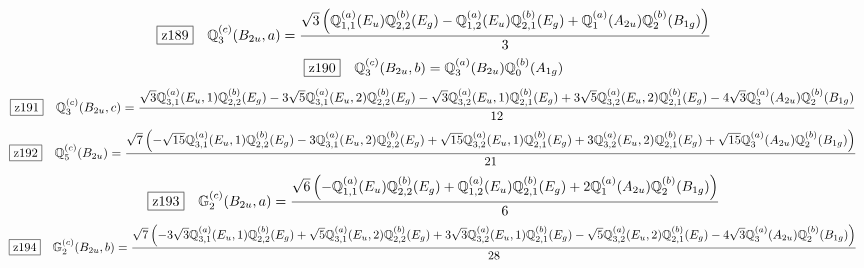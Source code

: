 \documentclass[fleqn,10pt,landscape]{jsarticle}
\begin{document}
\begin{dmath*}
\hspace*{3mm}\fbox{z189}\quad \mathbb{Q}_{3}^{(c)}(B_{2u},a)=\frac{\sqrt{3} \left(\mathbb{Q}_{1,1}^{(a)}(E_{u}) \mathbb{Q}_{2,2}^{(b)}(E_{g}) - \mathbb{Q}_{1,2}^{(a)}(E_{u}) \mathbb{Q}_{2,1}^{(b)}(E_{g}) + \mathbb{Q}_{1}^{(a)}(A_{2u}) \mathbb{Q}_{2}^{(b)}(B_{1g})\right)}{3}
\end{dmath*}
\begin{dmath*}
\hspace*{3mm}\fbox{z190}\quad \mathbb{Q}_{3}^{(c)}(B_{2u},b)=\mathbb{Q}_{3}^{(a)}(B_{2u}) \mathbb{Q}_{0}^{(b)}(A_{1g})
\end{dmath*}
\begin{dmath*}
\hspace*{3mm}\fbox{z191}\quad \mathbb{Q}_{3}^{(c)}(B_{2u},c)=\frac{\sqrt{3} \mathbb{Q}_{3,1}^{(a)}(E_{u},1) \mathbb{Q}_{2,2}^{(b)}(E_{g}) - 3 \sqrt{5} \mathbb{Q}_{3,1}^{(a)}(E_{u},2) \mathbb{Q}_{2,2}^{(b)}(E_{g}) - \sqrt{3} \mathbb{Q}_{3,2}^{(a)}(E_{u},1) \mathbb{Q}_{2,1}^{(b)}(E_{g}) + 3 \sqrt{5} \mathbb{Q}_{3,2}^{(a)}(E_{u},2) \mathbb{Q}_{2,1}^{(b)}(E_{g}) - 4 \sqrt{3} \mathbb{Q}_{3}^{(a)}(A_{2u}) \mathbb{Q}_{2}^{(b)}(B_{1g})}{12}
\end{dmath*}
\begin{dmath*}
\hspace*{3mm}\fbox{z192}\quad \mathbb{Q}_{5}^{(c)}(B_{2u})=\frac{\sqrt{7} \left(- \sqrt{15} \mathbb{Q}_{3,1}^{(a)}(E_{u},1) \mathbb{Q}_{2,2}^{(b)}(E_{g}) - 3 \mathbb{Q}_{3,1}^{(a)}(E_{u},2) \mathbb{Q}_{2,2}^{(b)}(E_{g}) + \sqrt{15} \mathbb{Q}_{3,2}^{(a)}(E_{u},1) \mathbb{Q}_{2,1}^{(b)}(E_{g}) + 3 \mathbb{Q}_{3,2}^{(a)}(E_{u},2) \mathbb{Q}_{2,1}^{(b)}(E_{g}) + \sqrt{15} \mathbb{Q}_{3}^{(a)}(A_{2u}) \mathbb{Q}_{2}^{(b)}(B_{1g})\right)}{21}
\end{dmath*}
\begin{dmath*}
\hspace*{3mm}\fbox{z193}\quad \mathbb{G}_{2}^{(c)}(B_{2u},a)=\frac{\sqrt{6} \left(- \mathbb{Q}_{1,1}^{(a)}(E_{u}) \mathbb{Q}_{2,2}^{(b)}(E_{g}) + \mathbb{Q}_{1,2}^{(a)}(E_{u}) \mathbb{Q}_{2,1}^{(b)}(E_{g}) + 2 \mathbb{Q}_{1}^{(a)}(A_{2u}) \mathbb{Q}_{2}^{(b)}(B_{1g})\right)}{6}
\end{dmath*}
\begin{dmath*}
\hspace*{3mm}\fbox{z194}\quad \mathbb{G}_{2}^{(c)}(B_{2u},b)=\frac{\sqrt{7} \left(- 3 \sqrt{3} \mathbb{Q}_{3,1}^{(a)}(E_{u},1) \mathbb{Q}_{2,2}^{(b)}(E_{g}) + \sqrt{5} \mathbb{Q}_{3,1}^{(a)}(E_{u},2) \mathbb{Q}_{2,2}^{(b)}(E_{g}) + 3 \sqrt{3} \mathbb{Q}_{3,2}^{(a)}(E_{u},1) \mathbb{Q}_{2,1}^{(b)}(E_{g}) - \sqrt{5} \mathbb{Q}_{3,2}^{(a)}(E_{u},2) \mathbb{Q}_{2,1}^{(b)}(E_{g}) - 4 \sqrt{3} \mathbb{Q}_{3}^{(a)}(A_{2u}) \mathbb{Q}_{2}^{(b)}(B_{1g})\right)}{28}
\end{dmath*}
\end{document}
